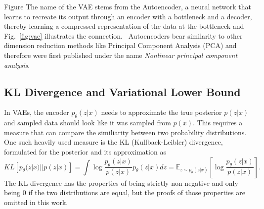 Figure
The name of the VAE stems from the Autoencoder, a neural network that learns to recreate its output through an encoder with a bottleneck and a decoder, thereby learning a compressed representation of the data at the bottleneck and Fig.~\ref{fig:vae} illustrates the connection.~\autocite{https://doi.org/10.1002/aic.690370209} Autoencoders bear similarity to other dimension reduction methods like Principal Component Analysis (PCA) and therefore were first published under the name \textit{Nonlinear principal component analysis}.
\subsection{KL Divergence and Variational Lower Bound}
In VAEs, the encoder $p_{\theta}(z|x)$ needs to approximate the true posterior $p(z|x)$ and sampled data should look like it was sampled from $p(x)$. This requires a measure that can compare the similiarity between two probability distributions. One such heavily used measure is the KL (Kullback-Leibler) divergence, formulated for the posterior and its approximation as
\begin{equation}
    \label{eq:kldivergence}
    KL\left[p_{\theta}(z|x) || p(z|x)\right] = \int \log \frac{p_{\theta}(z|x)}{p(z|x)} p_{\theta}(z|x) dz = \mathbb{E}_{z\sim p_{\theta}(z|x)}\left[\log \frac{p_{\theta}(z|x)}{p(z|x)}\right].
\end{equation}
The KL divergence has the properties of being strictly non-negative and only being 0 if the two distributions are equal, but the proofs of those properties are omitted in this work.

